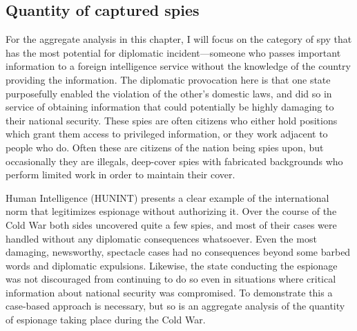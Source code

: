 \documentclass{memoir}
\begin{document}
\begin{refsegment}
\subsection{Quantity of captured spies}
For the aggregate analysis in this chapter, I will focus on the category of spy that has the most potential for diplomatic incident---someone who passes important information to a foreign intelligence service without the knowledge of the country providing the information. The diplomatic provocation here is that one state purposefully enabled the violation of the other's domestic laws, and did so in service of obtaining information that could potentially be highly damaging to their national security. These spies are often citizens who either hold positions which grant them access to privileged information, or they work adjacent to people who do. Often these are citizens of the nation being spies upon, but occasionally they are illegals, deep-cover spies with fabricated backgrounds who perform limited work in order to maintain their cover.

Human Intelligence (HUNINT) presents a clear example of the international norm that legitimizes espionage without authorizing it. Over the course of the Cold War both sides uncovered quite a few spies, and most of their cases were handled without any diplomatic consequences whatsoever. Even the most damaging, newsworthy, spectacle cases had no consequences beyond some barbed words and diplomatic expulsions. Likewise, the state conducting the espionage was not discouraged from continuing to do so even in situations where critical information about national security was compromised. To demonstrate this a case-based approach is necessary, but so is an aggregate analysis of the quantity of espionage taking place during the Cold War.



\end{refsegment}
\end{document}
